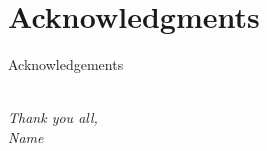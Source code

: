 
\chapter*{Acknowledgments}

Acknowledgements 


\quad \\[1cm]
\noindent
\textit{Thank you all,\\
Name
}